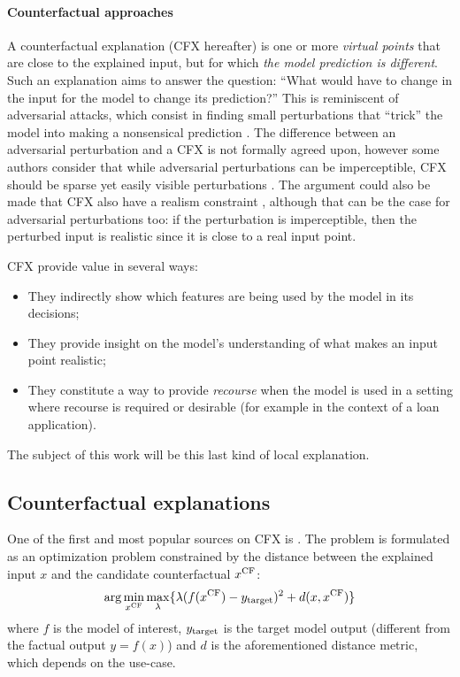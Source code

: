 \documentclass[../main.tex]{subfiles}
\begin{document}

\paragraph{Counterfactual approaches}

A counterfactual explanation (CFX hereafter) is one or more \emph{virtual points} that are close to the explained input, but for which \emph{the model prediction is different}.
Such an explanation aims to answer the question: ``What would have to change in the input for the model to change its prediction?''
This is reminiscent of adversarial attacks, which consist in finding small perturbations that ``trick'' the model into making a nonsensical prediction \cite{szegedyIntriguing2014,moosavi-dezfooliUniversal2017}.
The difference between an adversarial perturbation and a CFX is not formally agreed upon, however some authors consider that while adversarial perturbations can be imperceptible, CFX should be sparse yet easily visible perturbations \cite{laugelLocal2020}. The argument could also be made that CFX also have a realism constraint \citenote{}, although that can be the case for adversarial perturbations too: if the perturbation is imperceptible, then the perturbed input is realistic since it is close to a real input point.

CFX provide value in several ways:
\begin{itemize}
    \item They indirectly show which features are being used by the model in its decisions;
    \item They provide insight on the model's understanding of what makes an input point realistic;
    \item They constitute a way to provide \emph{recourse} when the model is used in a setting where recourse is required or desirable (for example in the context of a loan application).
\end{itemize}

The subject of this work will be this last kind of local explanation.

\subsection{Counterfactual explanations}

One of the first and most popular sources on CFX is \cite{wachterCounterfactual2017}. The problem is formulated as an optimization problem constrained by the distance between the explained input $x$ and the candidate counterfactual $x^\text{CF}$:
\begin{equation}
    \arg\min_{x^\text{CF}} \max_\lambda \{ \lambda (f(x^\text{CF}) - y_{\text{target}})^2 + d(x, x^\text{CF}) \}
\end{equation}
where $f$ is the model of interest, $y_{\text{target}}$ is the target model output (different from the factual output $y = f(x)$) and $d$ is the aforementioned distance metric, which depends on the use-case.
\end{document}
